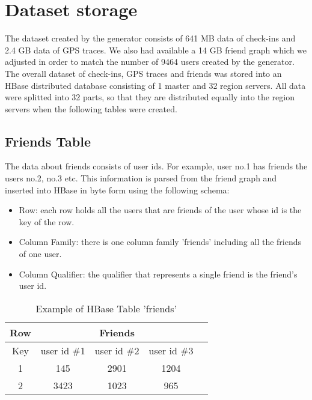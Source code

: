 \newpage

\section{Dataset storage}

The dataset created by the generator consists of 641 MB data of check-ins and 2.4 GB data of GPS traces. We also had available a 14 GB friend graph which 
we adjusted in order to match the number of 9464 users created by the generator. The overall dataset of check-ins, GPS traces and friends was stored 
into an HBase distributed database consisting of 1 master and 32 region servers. All data were splitted into 32 parts, so that they are 
distributed equally into the region servers when the following tables were created. 

\subsection{Friends Table}

The data about friends consists of user ids. For example, user no.1 has friends the users no.2, no.3 etc. This information is parsed from the friend graph and 
inserted into HBase in byte form using the following schema:

\begin{itemize}
 \item Row: each row holds all the users that are friends of the user whose id is the key of the row.
 \item Column Family: there is one column family 'friends' including all the friends of one user.
 \item Column Qualifier: the qualifier that represents a single friend is the friend's user id.
\end{itemize}

\begin{table}[H]
\begin{center}
\begin{tabular}{|c|c|c|c|c|}
 \hline
 Row & \multicolumn{3}{|c|}{Friends} \\
 \hline
 Key & user id \#1 & user id \#2 & user id \#3 \\
 \hline
 1 & 145 & 2901 & 1204 \\ \hline 
 2 & 3423 & 1023 & 965 \\
 \hline
\end{tabular}
\end{center}
\caption{Example of HBase Table 'friends'}
\end{table}

